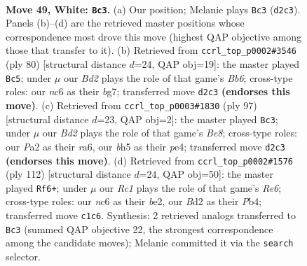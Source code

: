 \documentclass[11pt]{article}
\begin{document}
\clearpage

\begin{figure}[p]\centering
\begin{subfigure}{0.46\textwidth}\centering
\resizebox{\linewidth}{!}{%
\newchessgame
\chessboard[
  setfen={6k1/3r4/p1n2P2/7b/1P6/8/P2B2K1/2R5 w - - 3 49},
  showmover=false,
  pgfstyle=straightmove, color=movearrow, markmove={d2-c3}
]}
\caption{}
\end{subfigure}\hfill
\begin{subfigure}{0.46\textwidth}\centering
\resizebox{\linewidth}{!}{%
\newchessgame
\chessboard[
  setfen={6k1/2R3b1/1B1r2p1/6P1/5P2/8/4K3/8 w - - 5 41},
  showmover=false,
  pgfstyle=straightmove, color=movearrow, markmove={b6-c5}
]}
\caption{}
\end{subfigure}
\\[4pt]
\begin{subfigure}{0.46\textwidth}\centering
\resizebox{\linewidth}{!}{%
\newchessgame
\chessboard[
  setfen={4k3/8/R7/p3p1N1/4Pp1P/6r1/8/4bK2 b - - 4 49},
  showmover=false,
  pgfstyle=straightmove, color=movearrow, markmove={e1-c3}
]}
\caption{}
\end{subfigure}\hfill
\begin{subfigure}{0.46\textwidth}\centering
\resizebox{\linewidth}{!}{%
\newchessgame
\chessboard[
  setfen={5k2/7p/4R3/3B2p1/1P4P1/7P/1r2b3/6K1 w - - 5 57},
  showmover=false,
  pgfstyle=straightmove, color=movearrow, markmove={e6-f6}
]}
\caption{}
\end{subfigure}
\caption{\textbf{Move 49, White: \texttt{Bc3}.} (a) Our position; Melanie plays \texttt{Bc3} (\texttt{d2c3}). Panels (b)--(d) are the retrieved master positions whose correspondence most drove this move (highest QAP objective among those that transfer to it). (b) Retrieved from \texttt{ccrl\_top\_p0002\#3546} (ply 80) [structural distance $d$=24, QAP obj=19]: the master played \texttt{Bc5}; under $\mu$ our \emph{Bd2} plays the role of that game's \emph{Bb6}; cross-type roles: our \emph{n}c6 as their \emph{b}g7; transferred move \texttt{d2c3} \textbf{(endorses this move)}. (c) Retrieved from \texttt{ccrl\_top\_p0003\#1830} (ply 97) [structural distance $d$=23, QAP obj=2]: the master played \texttt{Bc3}; under $\mu$ our \emph{Bd2} plays the role of that game's \emph{Be8}; cross-type roles: our \emph{P}a2 as their \emph{r}a6, our \emph{b}h5 as their \emph{p}e4; transferred move \texttt{d2c3} \textbf{(endorses this move)}. (d) Retrieved from \texttt{ccrl\_top\_p0002\#1576} (ply 112) [structural distance $d$=24, QAP obj=50]: the master played \texttt{Rf6+}; under $\mu$ our \emph{Rc1} plays the role of that game's \emph{Re6}; cross-type roles: our \emph{n}c6 as their \emph{b}e2, our \emph{B}d2 as their \emph{P}b4; transferred move \texttt{c1c6}. Synthesis: 2 retrieved analogs transferred to \texttt{Bc3} (summed QAP objective 22, the strongest correspondence among the candidate moves); Melanie committed it via the \texttt{search} selector.}
\label{fig:thought-m96}
\end{figure}
\end{document}
